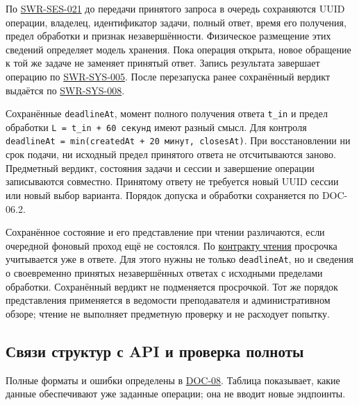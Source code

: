 \documentclass[12pt,a4paper]{article}
\begin{document}
По {\href{DOC-06.2\_Сессии\_задач\_и\_планировщик.pdf\#swr-ses-021}{SWR-SES-021}} до передачи принятого запроса в очередь сохраняются UUID операции, владелец, идентификатор задачи, полный ответ, время его получения, предел обработки и признак незавершённости. Физическое размещение этих сведений определяет модель хранения. Пока операция открыта, новое обращение к той же задаче не заменяет принятый ответ. Запись результата завершает операцию по {\hyperlink{swr-sys-005}{SWR-SYS-005}}. После перезапуска ранее сохранённый вердикт выдаётся по {\hyperlink{swr-sys-008}{SWR-SYS-008}}.

Сохранённые \texttt{deadlineAt}, момент полного получения ответа \texttt{t\_in} и предел обработки \texttt{L =\allowbreak{} t\_\allowbreak{}in + 60 секунд} имеют разный смысл. Для контроля \texttt{deadline\allowbreak{}At =\allowbreak{} min(created\allowbreak{}At + 20 минут, closes\allowbreak{}At)}. При восстановлении ни срок подачи, ни исходный предел принятого ответа не отсчитываются заново. Предметный вердикт, состояния задачи и сессии и завершение операции записываются совместно. Принятому ответу не требуется новый UUID сессии или новый выбор варианта. Порядок допуска и обработки сохраняется по DOC-06.2.

Сохранённое состояние и его представление при чтении различаются, если очередной фоновый проход ещё не состоялся. По {\href{../09\_Архитектура\_и\_API/DOC-08\_Справочник\_API.pdf\#3-чтение-состояния-и-восстановление-после-обрыва-связи}{контракту чтения}} просрочка учитывается уже в ответе. Для этого нужны не только \texttt{deadlineAt}, но и сведения о своевременно принятых незавершённых ответах с исходными пределами обработки. Сохранённый вердикт не подменяется просрочкой. Тот же порядок представления применяется в ведомости преподавателя и административном обзоре; чтение не выполняет предметную проверку и не расходует попытку.

\subsection{Связи структур с API и проверка полноты}\label{ux441ux432ux44fux437ux438-ux441ux442ux440ux443ux43aux442ux443ux440-ux441-api-ux438-ux43fux440ux43eux432ux435ux440ux43aux430-ux43fux43eux43bux43dux43eux442ux44b}

\hypertarget{связи-структур-с-api-и-проверка-полноты}{}

Полные форматы и ошибки определены в {\href{../09\_Архитектура\_и\_API/DOC-08\_Справочник\_API.pdf\#doc-08-справочник-api-платформы}{DOC-08}}. Таблица показывает, какие данные обеспечивают уже заданные операции; она не вводит новые эндпоинты.
\end{document}
